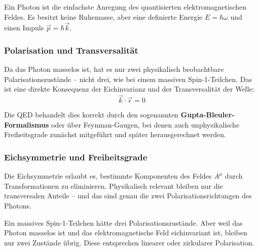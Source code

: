 \vspace{0.5em}
\begin{tcolorbox}[physikbox, title=Was ist ein Photon in der QED?]
	\label{box:Warum ist ein Photon in der QED}
	Ein Photon ist die einfachste Anregung des quantisierten elektromagnetischen Feldes. Es besitzt keine Ruhemasse, aber eine definierte Energie $E = \hbar \omega$ und einen Impuls $\vec{p} = \hbar \vec{k}$.
\end{tcolorbox}

\subsubsection*{Polarisation und Transversalität}
Da das Photon masselos ist, hat es nur zwei physikalisch beobachtbare Polarisationszustände – nicht drei, wie bei einem massiven Spin-1-Teilchen. Das ist eine direkte Konsequenz der Eichinvarianz und der Transversalität der Welle:
\[
\vec{k} \cdot \vec{\epsilon} = 0
\]

Die QED behandelt dies korrekt durch den sogenannten \textbf{Gupta-Bleuler-Formalismus} oder über Feynman-Gaugen, bei denen auch unphysikalische Freiheitsgrade zunächst mitgeführt und später herausgerechnet werden.

\subsubsection*{Eichsymmetrie und Freiheitsgrade}
Die Eichsymmetrie erlaubt es, bestimmte Komponenten des Feldes $A^\mu$ durch Transformationen zu eliminieren. Physikalisch relevant bleiben nur die transversalen Anteile – und das sind genau die zwei Polarisationsrichtungen des Photons.

\medskip
\begin{tcolorbox}[didaktikbox, title=Warum hat das Photon keinen Spin-3-Zustand?]
	\label{box:Warum hat das Photon keinen Spin-3-Zustand}
	Ein massives Spin-1-Teilchen hätte drei Polarisationszustände. Aber weil das Photon masselos ist und das elektromagnetische Feld eichinvariant ist, bleiben nur zwei Zustände übrig. Diese entsprechen linearer oder zirkularer Polarisation.
\end{tcolorbox}


